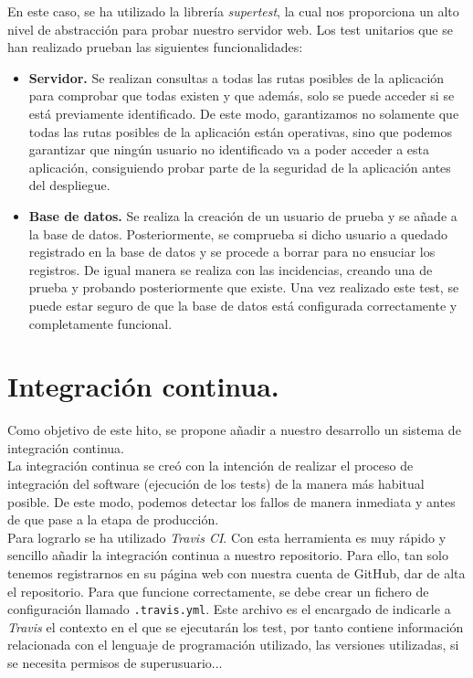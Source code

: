 En este caso, se ha utilizado la librería \textit{supertest}\cite{supertest}, la cual nos proporciona un alto nivel de abstracción para probar nuestro servidor web.
Los test unitarios que se han realizado prueban las siguientes funcionalidades:

\begin{itemize}
	\item \textbf{Servidor.} Se realizan consultas a todas las rutas posibles de la aplicación para comprobar que todas existen y que además, solo se puede acceder 
	si se está previamente identificado. De este modo, garantizamos no solamente que todas las rutas posibles de la aplicación están operativas, sino que podemos garantizar
	que ningún usuario no identificado va a poder acceder a esta aplicación, consiguiendo probar parte de la seguridad de la aplicación antes del despliegue.
	\item \textbf{Base de datos.} Se realiza la creación de un usuario de prueba y se añade a la base de datos. Posteriormente, se comprueba si dicho usuario a quedado registrado
	en la base de datos y se procede a borrar para no ensuciar los registros. De igual manera se realiza con las incidencias, creando una de prueba y probando posteriormente que
	existe. Una vez realizado este test, se puede estar seguro de que la base de datos está configurada correctamente y completamente funcional.
\end{itemize}  

\section{Integración continua.}

Como objetivo de este hito, se propone añadir a nuestro desarrollo un sistema de integración continua.\\

La integración continua se creó con la intención de realizar el proceso de integración del software (ejecución de los tests) de la manera más habitual posible. De este modo, 
podemos detectar los fallos de manera inmediata y antes de que pase a la etapa de producción.\\

Para lograrlo se ha utilizado \textit{Travis CI}\cite{travis-ci}. Con esta herramienta es muy rápido y sencillo añadir la integración continua a nuestro repositorio. Para ello,
tan solo tenemos registrarnos en su página web con nuestra cuenta de GitHub, dar de alta el repositorio. Para que funcione correctamente, se debe crear un fichero de configuración
llamado \verb|.travis.yml|. Este archivo es el encargado de indicarle a \textit{Travis} el contexto en el que se ejecutarán los test, por tanto contiene
información relacionada con el lenguaje de programación utilizado, las versiones utilizadas, si se necesita permisos de superusuario...\\

